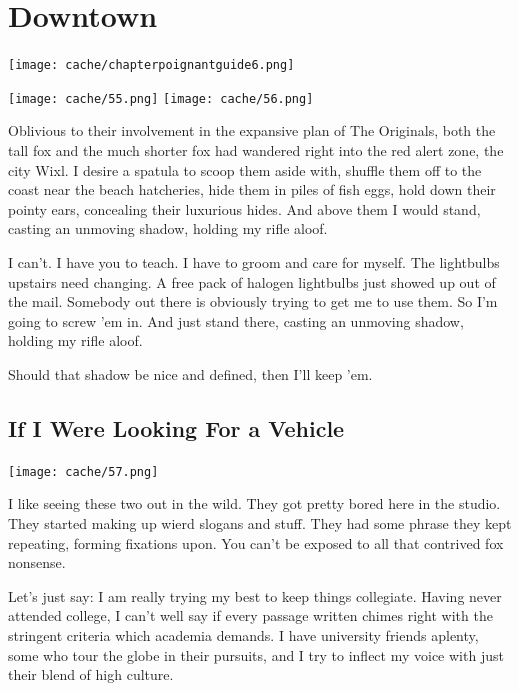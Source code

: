 \documentclass[12pt,twoside]{report}
\begin{document}
\newpage
\thispagestyle{empty}
\mbox{}
\newpage
\thispagestyle{empty}
\mbox{}
\cleartooddpage


\chapter{Downtown}
\vfill
\begin{center}
  \texttt{[image: cache/chapterpoignantguide6.png]}
\end{center}
\vspace{4.6cm}
\newpage
\thispagestyle{empty}
\mbox{}
\clearpage
	\texttt{[image: cache/55.png]}
        \texttt{[image: cache/56.png]}

Oblivious to their involvement in the expansive plan of The Originals,
both the tall fox and the much shorter fox had wandered right into the
red alert zone, the city Wixl.  I desire a spatula to scoop them aside
with, shuffle them off to the coast near the beach hatcheries, hide
them in piles of fish eggs, hold down their pointy ears, concealing
their luxurious hides.  And above them I would stand, casting an
unmoving shadow, holding my rifle aloof.

I can't.  I have you to teach.  I have to groom and care for myself.
The lightbulbs upstairs need changing.  A free pack of halogen
lightbulbs just showed up out of the mail.  Somebody out there is
obviously trying to get me to use them.  So I'm going to screw 'em in.
And just stand there, casting an unmoving shadow, holding my rifle
aloof.

Should that shadow be nice and defined, then I'll keep 'em.


\section{If I Were Looking For a Vehicle}


	\texttt{[image: cache/57.png]}

I like seeing these two out in the wild.  They got pretty bored here
in the studio.  They started making up wierd slogans and stuff.  They
had some phrase they kept repeating, forming fixations upon. You can't
be exposed to all that contrived fox nonsense.

Let's just say: I am really trying my best to keep things collegiate.
Having never attended college, I can't well say if every passage
written chimes right with the stringent criteria which academia
demands. I have university friends aplenty, some who tour the globe in
their pursuits, and I try to inflect my voice with just their blend of
high culture.
\end{document}
